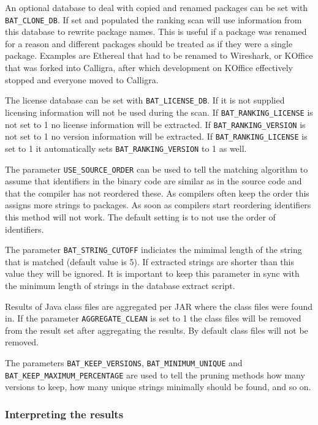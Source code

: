 \documentclass[10pt]{article}
\begin{document}
An optional database to deal with copied and renamed packages can be set with
\texttt{BAT\_CLONE\_DB}. If set and populated the ranking scan will use
information from this database to rewrite package names. This is useful if a
package was renamed for a reason and different packages should be treated as if
they were a single package. Examples are Ethereal that had to be renamed to
Wireshark, or KOffice that was forked into Calligra, after which development
on KOffice effectively stopped and everyone moved to Calligra.

The license database can be set with \texttt{BAT\_LICENSE\_DB}. If it is not
supplied licensing information will not be used during the scan. If
\texttt{BAT\_RANKING\_LICENSE} is not set to 1 no license information will be
extracted. If \texttt{BAT\_RANKING\_VERSION} is not set to 1 no version
information will be extracted. If \texttt{BAT\_RANKING\_LICENSE} is set to 1 it
automatically sets \texttt{BAT\_RANKING\_VERSION} to 1 as well.

The parameter \texttt{USE\_SOURCE\_ORDER} can be used to tell the matching
algorithm to assume that identifiers in the binary code are similar as in the
source code and that the compiler has not reordered these. As compilers often
keep the order this assigns more strings to packages. As soon as compilers
start reordering identifiers this method will not work. The default setting
is to not use the order of identifiers.

The parameter \texttt{BAT\_STRING\_CUTOFF} indiciates the mimimal length of the
string that is matched (default value is 5). If extracted strings are shorter
than this value they will be ignored. It is important to keep this parameter in
sync with the minimum length of strings in the database extract script.

Results of Java class files are aggregated per JAR where the class files were
found in. If the parameter \texttt{AGGREGATE\_CLEAN} is set to 1 the class
files will be removed from the result set after aggregating the results. By
default class files will not be removed.

The parameters \texttt{BAT\_KEEP\_VERSIONS}, \texttt{BAT\_MINIMUM\_UNIQUE} and
\texttt{BAT\_KEEP\_MAXIMUM\_PERCENTAGE} are used to tell the pruning methods
how many versions to keep, how many unique strings minimally should be found,
and so on.

\subsubsection{Interpreting the results}
\end{document}
